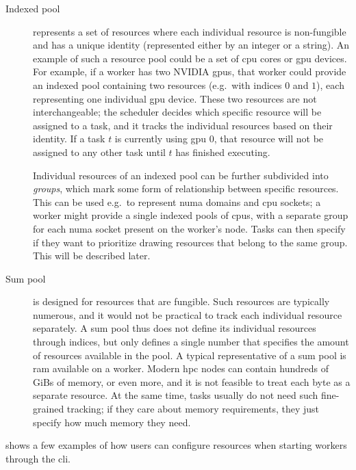 \begin{description}
	\item [Indexed pool] represents a set of resources where each individual resource is
	      non-fungible and has a unique identity (represented either by an integer or a string). An example
	      of such a resource pool could be a set of \gls{cpu} cores or \gls{gpu}
	      devices. For example, if a worker has two NVIDIA \glspl{gpu}, that worker could provide
	      an indexed pool containing two resources (e.g.\ with indices $0$ and
	      $1$), each representing one individual \gls{gpu} device. These two
	      resources are not interchangeable; the scheduler decides which specific resource will be assigned
	      to a task, and it tracks the individual resources based on their identity. If a task
	      $t$ is currently using \gls{gpu} $0$, that
	      resource will not be assigned to any other task until $t$ has finished executing.

	      Individual resources of an indexed pool can be further subdivided into \emph{groups},
	      which mark some form of relationship between specific resources. This can be used e.g.\ to
	      represent \gls{numa} domains and \gls{cpu} sockets; a worker might provide
	      a single indexed pools of \glspl{cpu}, with a separate group for each
	      \gls{numa} socket present on the worker's node. Tasks can then specify if they want to
	      prioritize drawing resources that belong to the same group. This will be described later.
	\item [Sum pool] is designed for resources that are fungible. Such resources are typically
	      numerous, and it would not be practical to track each individual resource separately. A sum pool
	      thus does not define its individual resources through indices, but only defines a single number
	      that specifies the amount of resources available in the pool. A typical representative of a sum
	      pool is \gls{ram} available on a worker. Modern \gls{hpc} nodes can
	      contain hundreds of GiBs of memory, or even more, and it is not feasible to treat each byte as a
	      separate resource. At the same time, tasks usually do not need such fine-grained tracking; if they
	      care about memory requirements, they just specify how much memory they need.
\end{description}

 shows a few examples of how users can configure resources
when starting workers through the \gls{cli}.

